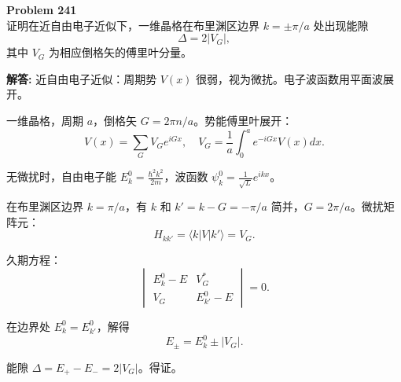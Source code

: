 \documentclass[12pt, a4paper, oneside]{ctexart}
\newenvironment{solution}{\par\noindent\textbf{解答:}\quad}{\par}
\begin{document}
\begin{mdframed}[backgroundcolor=gray!10, linewidth=0pt]
    \textbf{Problem 241} \\
    证明在近自由电子近似下，一维晶格在布里渊区边界 $k = \pm \pi/a$ 处出现能隙
    \[
    \Delta = 2 |V_G|,
    \]
    其中 $V_G$ 为相应倒格矢的傅里叶分量。
\end{mdframed}
\begin{solution}
    近自由电子近似：周期势 $V(x)$ 很弱，视为微扰。电子波函数用平面波展开。
    
    一维晶格，周期 $a$，倒格矢 $G = 2\pi n / a$。势能傅里叶展开：
    \[
    V(x) = \sum_G V_G e^{i G x}, \quad V_G = \frac{1}{a} \int_0^a e^{-i G x} V(x) dx.
    \]
    
    无微扰时，自由电子能 $E_k^0 = \frac{\hbar^2 k^2}{2m}$，波函数 $\psi_k^0 = \frac{1}{\sqrt{L}} e^{i k x}$。
    
    在布里渊区边界 $k = \pi/a$，有 $k$ 和 $k' = k - G = -\pi/a$ 简并，$G = 2\pi/a$。微扰矩阵元：
    \[
    H_{kk'} = \langle k | V | k' \rangle = V_G.
    \]
    
    久期方程：
    \[
    \begin{vmatrix}
        E_k^0 - E & V_G^* \\
        V_G & E_{k'}^0 - E
    \end{vmatrix} = 0.
    \]
    
    在边界处 $E_k^0 = E_{k'}^0$，解得
    \[
    E_\pm = E_k^0 \pm |V_G|.
    \]
    
    能隙 $\Delta = E_+ - E_- = 2 |V_G|$。得证。
\end{solution}
\end{document}
